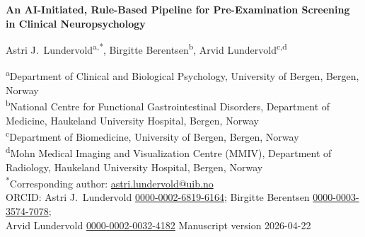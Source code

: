 \documentclass[11pt,a4paper]{article}
\begin{document}
\begin{center}
{\Large\bfseries An AI-Initiated, Rule-Based Pipeline for Pre-Examination Screening in Clinical Neuropsychology}

\bigskip

Astri J.\ Lundervold\textsuperscript{a,*},\quad
Birgitte Berentsen\textsuperscript{b},\quad
Arvid Lundervold\textsuperscript{c,d}

\medskip

{\small
\textsuperscript{a}Department of Clinical and Biological Psychology, University of Bergen, Bergen, Norway\\
\textsuperscript{b}National Centre for Functional Gastrointestinal Disorders, Department of Medicine, Haukeland University Hospital, Bergen, Norway\\
\textsuperscript{c}Department of Biomedicine, University of Bergen, Bergen, Norway\\
\textsuperscript{d}Mohn Medical Imaging and Visualization Centre (MMIV), Department of Radiology, Haukeland University Hospital, Bergen, Norway\\[4pt]
\textsuperscript{*}Corresponding author: \href{mailto:astri.lundervold@uib.no}{astri.lundervold@uib.no}\\[4pt]
ORCID: Astri J.\ Lundervold \href{https://orcid.org/0000-0002-6819-6164}{0000-0002-6819-6164};\quad
Birgitte Berentsen \href{https://orcid.org/0000-0003-3574-7078}{0000-0003-3574-7078};\\
Arvid Lundervold \href{https://orcid.org/0000-0002-0032-4182}{0000-0002-0032-4182} {\tiny Manuscript version 2026-04-22}
}
\end{center}

\bigskip
\end{document}
